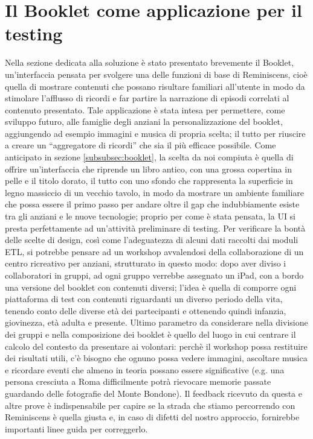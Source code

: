 \documentclass[sigproc-sp.tex]{subfiles}
\begin{document}
\section{Il Booklet come applicazione per il testing}
\label{app:booklet}
Nella sezione dedicata alla soluzione è stato presentato brevemente il Booklet, un’interfaccia pensata per svolgere una delle funzioni di base di Reminiscens, cioè quella di mostrare contenuti che possano risultare familiari all’utente in modo da stimolare l’afflusso di ricordi e far partire la narrazione di episodi correlati al contenuto presentato. Tale applicazione è stata intesa per permettere, come sviluppo futuro, alle famiglie degli anziani la personalizzazione del booklet, aggiungendo ad esempio immagini e musica di propria scelta; il tutto per riuscire a creare un “aggregatore di ricordi” che sia il più efficace possibile. Come anticipato in sezione \ref{subsubsec:booklet}, la scelta da noi compiuta è quella di offrire un’interfaccia che riprende un libro antico, con una grossa copertina in pelle e il titolo dorato, il tutto con uno sfondo che rappresenta la superficie in legno massiccio di un vecchio tavolo, in modo da mostrare un ambiente familiare che possa essere il primo passo per andare oltre il gap che indubbiamente esiste tra gli anziani e le nuove tecnologie; proprio per come è stata pensata, la UI si presta perfettamente ad un’attività preliminare di testing. Per verificare la bontà delle scelte di design, così come l’adeguatezza di alcuni dati raccolti dai moduli ETL, si potrebbe pensare ad un workshop avvalendosi della collaborazione di un centro ricreativo per anziani, strutturato in questo modo: dopo aver diviso i collaboratori in gruppi, ad ogni gruppo verrebbe assegnato un iPad, con a bordo una versione del booklet con contenuti diversi; l’idea è quella di comporre ogni piattaforma di test con contenuti riguardanti un diverso periodo della vita, tenendo conto delle diverse età dei partecipanti e ottenendo quindi infanzia, giovinezza, età adulta e presente. Ultimo parametro da considerare nella divisione dei gruppi e nella composizione dei booklet è quello del luogo in cui centrare il calcolo del contesto da presentare ai volontari: perchè il workshop possa restituire dei risultati utili, c’è bisogno che ognuno possa vedere immagini, ascoltare musica e ricordare eventi che almeno in teoria possano essere significative (e.g. una persona cresciuta a Roma difficilmente potrà rievocare memorie passate guardando delle fotografie del Monte Bondone). Il feedback ricevuto da questa e altre prove è indispensabile per capire se la strada che stiamo percorrendo con Reminiscens è quella giusta e, in caso di difetti del nostro approccio, fornirebbe importanti linee guida per correggerlo.
\end{document}

